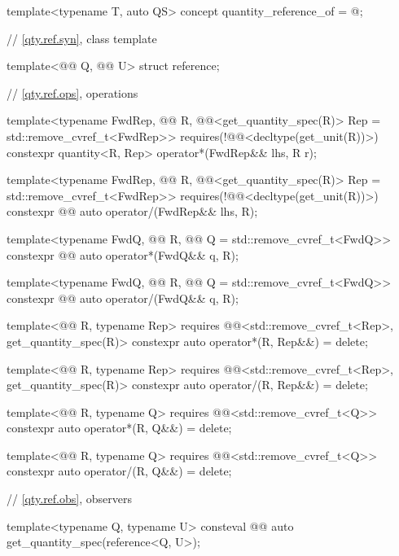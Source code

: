 \begin{codeblock}
{template<typename T, auto QS>
concept quantity_reference_of = @\seebelownc@;

// \ref{qty.ref.syn}, class template 

template<@@ Q, @@ U>
struct reference;

// \ref{qty.ref.ops}, operations

template<typename FwdRep, @@ R,
         @@<get_quantity_spec(R{})> Rep = std::remove_cvref_t<FwdRep>>
  requires(!@@<decltype(get_unit(R{}))>)
constexpr quantity<R{}, Rep> operator*(FwdRep&& lhs, R r);

template<typename FwdRep, @@ R,
         @@<get_quantity_spec(R{})> Rep = std::remove_cvref_t<FwdRep>>
  requires(!@@<decltype(get_unit(R{}))>)
constexpr @@ auto operator/(FwdRep&& lhs, R);

template<typename FwdQ, @@ R, @@ Q = std::remove_cvref_t<FwdQ>>
constexpr @@ auto operator*(FwdQ&& q, R);

template<typename FwdQ, @@ R, @@ Q = std::remove_cvref_t<FwdQ>>
constexpr @@ auto operator/(FwdQ&& q, R);

template<@@ R, typename Rep>
  requires @@<std::remove_cvref_t<Rep>, get_quantity_spec(R{})>
constexpr auto operator*(R, Rep&&) = delete;

template<@@ R, typename Rep>
  requires @@<std::remove_cvref_t<Rep>, get_quantity_spec(R{})>
constexpr auto operator/(R, Rep&&) = delete;

template<@@ R, typename Q>
  requires @@<std::remove_cvref_t<Q>>
constexpr auto operator*(R, Q&&) = delete;

template<@@ R, typename Q>
  requires @@<std::remove_cvref_t<Q>>
constexpr auto operator/(R, Q&&) = delete;

// \ref{qty.ref.obs}, observers

template<typename Q, typename U>
consteval @@ auto get_quantity_spec(reference<Q, U>);

}
\end{codeblock}
